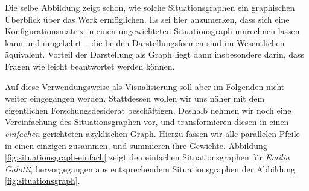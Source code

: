 \documentclass[a4paper,10pt,abstract=true,headings=small]{scrartcl}
\begin{document}
Die selbe Abbildung zeigt schon, wie solche Situationsgraphen ein graphischen Überblick über das Werk ermöglichen.
Es sei hier anzumerken, dass sich eine Konfigurationsmatrix in einen ungewichteten Situationsgraph umrechnen lassen kann und umgekehrt – die beiden Darstellungsformen sind im Wesentlichen äquivalent.
Vorteil der Darstellung als Graph liegt dann insbesondere darin, dass Fragen wie  leicht beantwortet werden können. %

Auf diese Verwendungsweise als Visualisierung soll aber im Folgenden nicht weiter eingegangen werden.
Stattdessen wollen wir uns näher mit dem eigentlichen Forschungsdesiderat beschäftigen.
Deshalb nehmen wir noch eine Vereinfachung des Situationsgraphen vor, und transformieren diesen in einen \emph{einfachen} gerichteten azyklischen Graph.
Hierzu fassen wir alle parallelen Pfeile in einen einzigen zusammen, und summieren ihre Gewichte.
Abbildung \ref{fig:situationsgraph-einfach} zeigt den einfachen Situationsgraphen für \emph{Emilia Galotti}, hervorgegangen aus entsprechendem Situationsgraphen der Abbildung \ref{fig:situationsgraph}.
\end{document}

